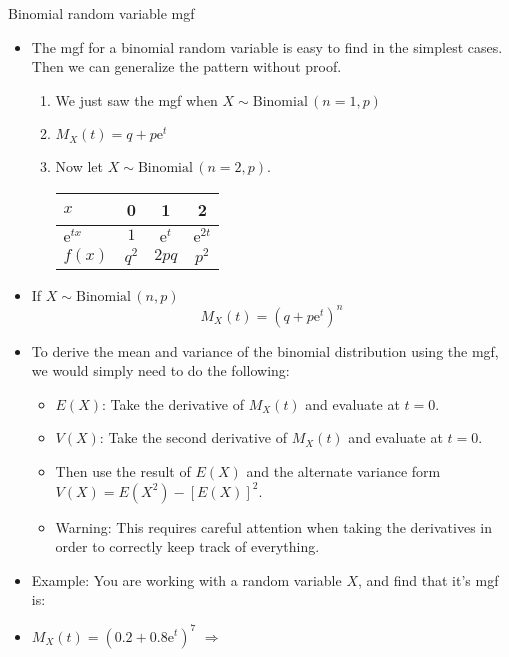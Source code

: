 \documentclass{article}
\newcommand{\follow}[1]{\sim \text{#1}\,}		%
\newcommand{\e}{\mathrm{e}}		%
\begin{document}
Binomial random variable mgf\bigskip
\begin{itemize}
    \item The mgf for a binomial random variable is easy to find in the simplest cases. Then we can generalize the pattern without proof.
    \begin{enumerate}
        \item We just saw the mgf when $X \follow{Binomial}(n = 1, p)$
        \item[] $M_X(t) = q + p\e^t$\bigskip
        \item Now let $X \follow{Binomial}(n = 2, p)$.\bigskip\\
        \begin{tabular}{| l || c | c | c |}
            \hline
            $x$ & 0 & 1 & 2\\
            \hline
            $\e^{tx}$ & $1$ & $\e^{t}$ & $\e^{2t}$\\
            \hline
            $f(x)$ & $q^2$ & $2pq$ & $p^2$\\
            \hline
        \end{tabular}\vspace{40pt}
    \end{enumerate}
    \item If $X \follow{Binomial}(n, p)$
    \[M_X(t) = (q + p\e^t)^n\]
    \item To derive the mean and variance of the binomial distribution using the mgf, we would simply need to do the following:
    \begin{itemize}
        \item $E(X)$: Take the derivative of $M_X(t)$ and evaluate at $t = 0$.
        \item $V(X)$: Take the second derivative of $M_X(t)$ and evaluate at $t = 0$.
        \item[] Then use the result of $E(X)$ and the alternate variance form \\ $V(X) = E(X^2) - [E(X)]^2$.
        \item Warning: This requires careful attention when taking the derivatives in order to correctly keep track of everything.
    \end{itemize}
    \item Example: You are working with a random variable $X$, and find that it's mgf is:\smallskip
    \item[] $M_X(t) = (0.2 + 0.8\e^t)^7$  $\Longrightarrow$ 
\end{itemize}\bigskip
\end{document}
